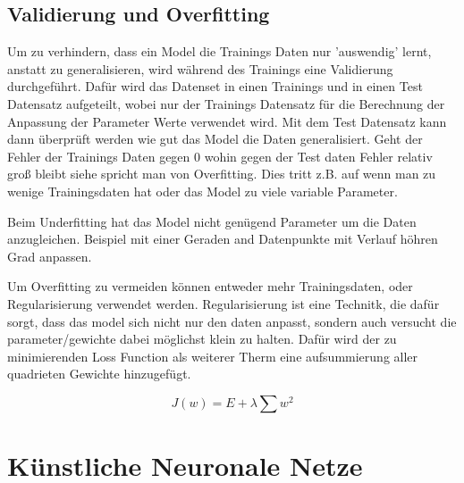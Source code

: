 \subsection{Validierung und Overfitting}

Um zu verhindern, dass ein Model die Trainings Daten nur 'auswendig' lernt, anstatt zu generalisieren, wird während des Trainings eine 
Validierung durchgeführt. Dafür wird das Datenset in einen Trainings und in einen Test Datensatz aufgeteilt, wobei nur der Trainings
Datensatz für die Berechnung der Anpassung der Parameter Werte verwendet wird. Mit dem Test Datensatz kann dann überprüft
werden wie gut das Model die Daten generalisiert. Geht der Fehler der Trainings Daten gegen 0 wohin gegen der Test daten Fehler relativ
groß bleibt siehe %
spricht man von Overfitting. Dies tritt z.B. auf wenn man zu wenige Trainingsdaten hat oder das Model zu viele 
variable Parameter.

Beim Underfitting hat das Model nicht genügend Parameter um die Daten anzugleichen. Beispiel %
mit einer Geraden and Datenpunkte mit Verlauf höhren Grad anpassen.

Um Overfitting zu vermeiden können entweder mehr Trainingsdaten, oder Regularisierung verwendet werden.
Regularisierung ist eine Technitk, die dafür sorgt, dass das model sich nicht nur den daten anpasst, sondern auch versucht die 
parameter/gewichte dabei möglichst klein zu halten. Dafür wird der zu minimierenden Loss Function als weiterer 
Therm eine aufsummierung aller quadrieten Gewichte hinzugefügt. \cite{geronHandsonMachineLearning2017}

\begin{equation}
    J(w) = E + \lambda \sum w^{2}
\end{equation}




\section{Künstliche Neuronale Netze} \label{sec:nn}


